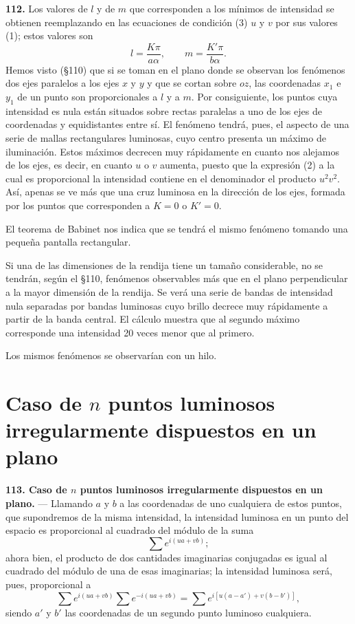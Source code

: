 \noindent\textbf{112.} Los valores de $l$ y de $m$ que corresponden a los
mínimos de intensidad se obtienen reemplazando en las ecuaciones de
condición (3) $u$ y $v$ por sus valores (1); estos valores son
\[
l=\frac{K\pi}{a\alpha},\qquad m=\frac{K'\pi}{b\alpha}.
\]
Hemos visto (§110) que si se toman en el plano donde se observan los
fenómenos dos ejes paralelos a los ejes $x$ y $y$ y que se cortan sobre
$oz$, las coordenadas $x_1$ e $y_1$ de un punto son proporcionales a $l$ y
a $m$. Por consiguiente, los puntos cuya intensidad es nula están
situados sobre rectas paralelas a uno de los ejes de coordenadas y
equidistantes entre sí. El fenómeno tendrá, pues, el aspecto de una serie
de mallas rectangulares luminosas, cuyo centro presenta un máximo de
iluminación. Estos máximos decrecen muy rápidamente en cuanto nos
alejamos de los ejes, es decir, en cuanto $u$ o $v$ aumenta, puesto que
la expresión (2) a la cual es proporcional la intensidad contiene en el
denominador el producto $u^2v^2$. Así, apenas se ve más que una cruz
luminosa en la dirección de los ejes, formada por los puntos que
corresponden a $K=0$ o $K'=0$.

El teorema de Babinet nos indica que se tendrá el mismo fenómeno tomando
una pequeña pantalla rectangular.

Si una de las dimensiones de la rendija tiene un tamaño considerable, no
se tendrán, según el §110, fenómenos observables más que en el plano
perpendicular a la mayor dimensión de la rendija. Se verá una serie de
bandas de intensidad nula separadas por bandas luminosas cuyo brillo
decrece muy rápidamente a partir de la banda central. El cálculo muestra
que al segundo máximo corresponde una intensidad 20 veces menor que al
primero.

Los mismos fenómenos se observarían con un hilo.

\section{Caso de \texorpdfstring{$n$}{n} puntos luminosos irregularmente
dispuestos en un plano}

\noindent\textbf{113. Caso de $n$ puntos luminosos irregularmente
dispuestos en un plano.} — Llamando $a$ y $b$ a las coordenadas de uno
cualquiera de estos puntos, que supondremos de la misma intensidad, la
intensidad luminosa en un punto del espacio es proporcional al cuadrado
del módulo de la suma
\[
\sum e^{i(ua+vb)};
\]
ahora bien, el producto de dos cantidades imaginarias conjugadas es igual
al cuadrado del módulo de una de esas imaginarias; la intensidad luminosa
será, pues, proporcional a
\[
\sum e^{i(ua+vb)} \sum e^{-i(ua+vb)} = \sum e^{i[u(a-a')+v(b-b')]},
\]
siendo $a'$ y $b'$ las coordenadas de un segundo punto luminoso
cualquiera.

